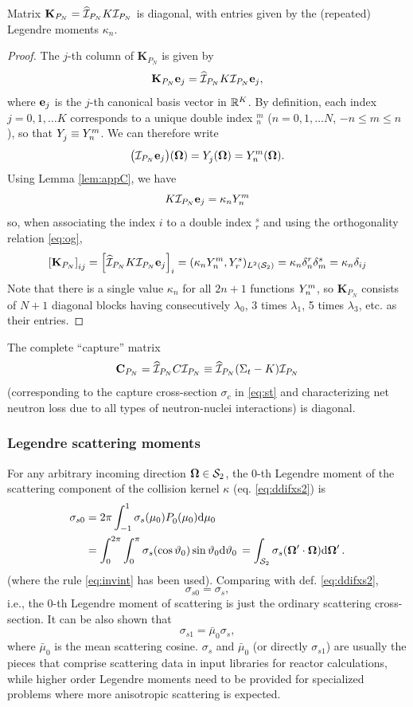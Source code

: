 \begin{corollary}
	Matrix $\mathbf{K}_{P_N} = \PihPN K \PiPN$ is diagonal, with entries given by the (repeated) Legendre moments $\kappa_n$.
\end{corollary}
\begin{proof}
	The $j$-th column of $\mathbf{K}_{P_N}$ is given by
	$$
		\mathbf{K}_{P_N}\mat{e}_j = \PihPN K \PiPN \mat{e}_j,
	$$
	where $\mat{e}_j$ is the $j$-th canonical basis vector in $\R[K]$. By definition, each index \mbox{$j = 0,1,\ldots K$}
	corresponds to a unique double index ${}_n^m$ ($n = 0,1,\ldots N$, \linebreak$-n \leq m \leq n$), so that $\Y{j}{}
	\equiv \Y{n}{m}$.
	We can therefore write 
	$$
		\bigl(\PiPN \mat{e}_j\bigr)(\bomega) = \Y{j}{}(\bomega) = Y_n^m(\bomega).
	$$
	Using Lemma \ref{lem:appC}, we have 
	$$
		K \PiPN \mat{e}_j = \kappa_n \Y{n}{m}
	$$
	so, when associating the index $i$ to a double index ${}_r^s$ and using the orthogonality relation \eqref{eq:og},
	$$
	\left[\mathbf{K}_{P_N}\right]_{ij} = \left[\PihPN K \PiPN \mat{e}_j\right]_i = (\kappa_n \Y{n}{m},
		\Y{r}{s})_{\Lp[2](\Sphere)} = \kappa_n\delta_{n}^{r}\delta_{m}^{s} = \kappa_n\kron{i}{j}
	$$
	Note that there is a single value $\kappa_n$ for all $2n + 1$ functions  $\Y{n}{m}$, so $\mathbf{K}_{P_N}$ consists of
	$N+1$ diagonal blocks having consecutively $\lambda_0$, 3 times $\lambda_1$, 5 times $\lambda_3$, etc.  as their
	entries.
\end{proof}
\begin{corollary}\label{cor:capture}
The complete ``capture'' matrix 
$$
	\mat{C}_{P_N} = \PihPN C \PiPN \equiv \PihPN (\Sigma_t - K) \PiPN 
$$
(corresponding to the capture cross-section $\sigma_c$ in \eqref{eq:st} and characterizing net neutron loss due to
all types of neutron-nuclei interactions) is diagonal.
\end{corollary}

\subsubsection{Legendre scattering moments}\label{rem:app:c}
For any arbitrary incoming direction $\bomega\in\Sphere$, the $0$-th Legendre moment of
the scattering component of the collision kernel $\kappa$ (eq. \eqref{eq:ddifxs2}) is
$$
	\begin{aligned}
		\sigma_{s0} &= 2\pi \muint[_0]{\sigma_s(\mu_0)\P{0}{}(\mu_0)}\\
		& = \int_{0}^{2\pi} \int_{0}^{\pi}
		\sigma_s(\cos \polar_0) \sin \polar_0\d{\polar_0} = 
		\int_{\Sphere} \sigma_s(\bomega'\cdot\bomega) \d{\bomega'}.
\end{aligned}
$$
(where the rule \eqref{eq:invint} has been used). Comparing with def. \eqref{eq:ddifxs2}, 
$$
	\sigma_{s0} = \sigma_s,
$$
i.e., the $0$-th Legendre moment of scattering is just the ordinary scattering cross-section. It can be also shown that 
$$
	\sigma_{s1} = \bar\mu_0\sigma_s,
$$
where $\bar\mu_0$ is the mean scattering cosine. $\sigma_s$ and $\bar{\mu}_0$ (or directly $\sigma_{s1}$) are usually
the pieces that comprise scattering data in input libraries for reactor calculations, while higher order Legendre
moments need to be provided for specialized problems where more anisotropic scattering is expected. 

